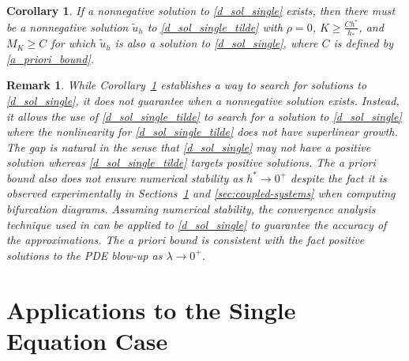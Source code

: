 \documentclass[12pt, reqno]{amsart}
\numberwithin{equation}{section}
\newtheorem{rem}{Remark}[section]
\newtheorem{cor}[thm]{Corollary}
\begin{document}
\begin{cor}\label{cor:stability}
If a nonnegative solution to \eqref{d_sol_single} exists, then there must be a nonnegative solution $\widetilde{u}_h$ to \eqref{d_sol_single_tilde} 
with $\rho = 0$, $K \geq \frac{C h^*}{h_*}$, and $M_K \geq C$ 
for which $\widetilde{u}_h$ is also a solution to \eqref{d_sol_single}, 
where $C$ is defined by \eqref{a_priori_bound}.  
\end{cor}


\begin{rem}%
\label{rem:limitations}
While Corollary~\ref{cor:stability} establishes a way to search for solutions to \eqref{d_sol_single}, it does not guarantee when a nonnegative solution exists.  Instead, it allows the use of \eqref{d_sol_single_tilde} to search for a solution to \eqref{d_sol_single} where the nonlinearity for \eqref{d_sol_single_tilde} does not have superlinear growth.  The gap is natural in the sense that \eqref{d_sol_single} may not have a positive solution whereas \eqref{d_sol_single_tilde} targets positive solutions.  The {\it a priori} bound also does not ensure numerical stability as $h^* \to 0^+$ despite the fact it is observed experimentally in Sections~\ref{sec:single-equation} and \ref{sec:coupled-systems} when computing bifurcation diagrams.  Assuming numerical stability, the convergence analysis technique used in \cite{Lewis_Morris_Zhang_2022} can be applied to \eqref{d_sol_single} to guarantee the accuracy of the approximations.
The {\it a priori} bound is consistent with the fact positive solutions to the PDE blow-up as $\lambda \to 0^+$.  
\end{rem}

\section{Applications to the Single Equation Case} 
\label{sec:single-equation}
\end{document}
